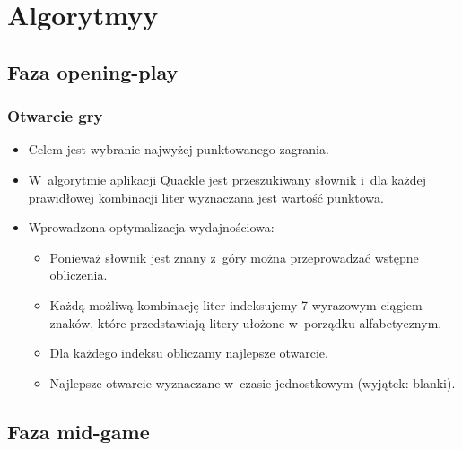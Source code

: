 \documentclass[10pt,a4paper]{beamer}
\begin{document}
\section{Algorytmyy}
\subsection{Faza opening-play}

\begin{frame}
	\frametitle{Otwarcie gry}

	\begin{itemize}
		\item Celem jest wybranie najwyżej punktowanego zagrania.
		\item W~algorytmie aplikacji Quackle jest przeszukiwany słownik i~dla każdej prawidłowej kombinacji liter wyznaczana jest wartość punktowa.
		\item Wprowadzona optymalizacja wydajnościowa:
			\begin{itemize}
				\item Ponieważ słownik jest znany z~góry można przeprowadzać wstępne obliczenia.
				\item Każdą możliwą kombinację liter indeksujemy 7-wyrazowym ciągiem znaków, które przedstawiają litery ułożone w~porządku alfabetycznym.
				\item Dla każdego indeksu obliczamy najlepsze otwarcie.
				\item Najlepsze otwarcie wyznaczane w~czasie jednostkowym (wyjątek: blanki).
			\end{itemize}
	\end{itemize}
\end{frame}

\subsection{Faza mid-game}
\captionsetup[figure]{skip=2pt}
\end{document}
